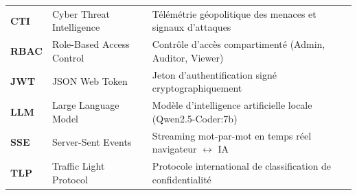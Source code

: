 \begin{singlespace}
{\begin{tabularx}{\textwidth}{l p{5.2cm} X}
\textbf{CTI} & Cyber Threat Intelligence & Télémétrie géopolitique des menaces et signaux d'attaques \\
\textbf{RBAC} & Role-Based Access Control & Contrôle d'accès compartimenté (Admin, Auditor, Viewer) \\
\textbf{JWT} & JSON Web Token & Jeton d'authentification signé cryptographiquement \\
\textbf{LLM} & Large Language Model & Modèle d'intelligence artificielle locale (Qwen2.5-Coder:7b) \\
\textbf{SSE} & Server-Sent Events & Streaming mot-par-mot en temps réel navigateur $\leftrightarrow$ IA \\
\textbf{TLP} & Traffic Light Protocol & Protocole international de classification de confidentialité \\
\bottomrule
\end{tabularx}
}
\end{singlespace}

